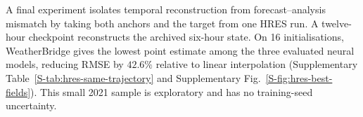A final experiment isolates temporal reconstruction from forecast--analysis
mismatch by taking both anchors and the target from one HRES run. A twelve-hour
checkpoint reconstructs the archived six-hour state. On 16 initialisations,
WeatherBridge gives the lowest point estimate among the three evaluated neural
models, reducing RMSE by $42.6\%$ relative to linear interpolation
(Supplementary Table~\ref{S-tab:hres-same-trajectory} and Supplementary
Fig.~\ref{S-fig:hres-best-fields}).
This small 2021 sample is exploratory and has no training-seed uncertainty.
